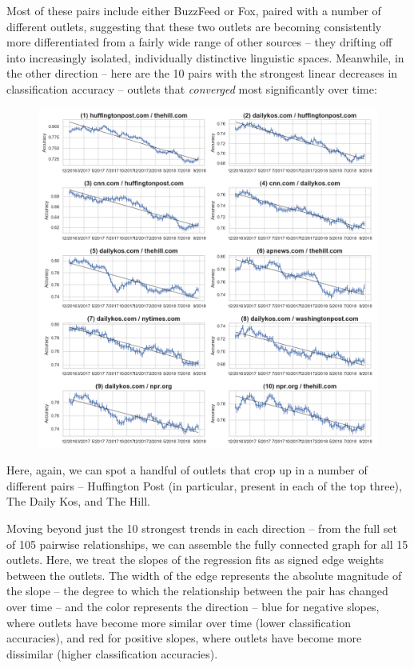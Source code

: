 \documentclass{scrartcl}
\begin{document}
Most of these pairs include either BuzzFeed or Fox, paired with a number of different outlets, suggesting that these two outlets are becoming consistently more differentiated from a fairly wide range of other sources -- they drifting off into increasingly isolated, individually distinctive linguistic spaces. Meanwhile, in the other direction -- here are the 10 pairs with the strongest linear decreases in classification accuracy -- outlets that \textit{converged} most significantly over time:

\begin{figure}[H]
  \centering
  \includegraphics[height=\textheight]{figures/ts-ab-falling.png}
  \caption{}
  \label{fig:ts-ab-falling}
\end{figure}

Here, again, we can spot a handful of outlets that crop up in a number of different pairs -- Huffington Post (in particular, present in each of the top three), The Daily Kos, and The Hill.

Moving beyond just the 10 strongest trends in each direction -- from the full set of 105 pairwise relationships, we can assemble the fully connected graph for all 15 outlets. Here, we treat the slopes of the regression fits as signed edge weights between the outlets. The width of the edge represents the absolute magnitude of the slope -- the degree to which the relationship between the pair has changed over time -- and the color represents the direction -- blue for negative slopes, where outlets have become more similar over time (lower classification accuracies), and red for positive slopes, where outlets have become more dissimilar (higher classification accuracies).
\end{document}
